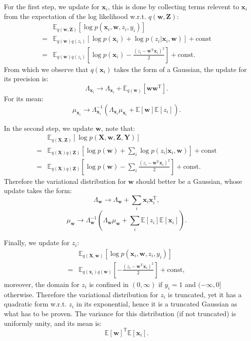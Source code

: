 \documentclass[UTF8]{ctexart}
\begin{document}
For the first step, we update for $\textbf{x}_{i}$, this is done by collecting terms relevent to $\textbf{x}_{i}$ from the expectation of the log likelihood w.r.t. $q(\textbf{w},\textbf{Z})$:
$$
\begin{aligned}
&\mathbb{E}_{q(\textbf{w},\textbf{Z})}\left[\log p(\textbf{x}_{i},\textbf{w},z_{i},y_{i}) \right]\\
=& \mathbb{E}_{q(\textbf{w})q(z_{i})}\left[ \log p(\textbf{x}_{i})+\log p(z_{i}|\textbf{x}_{i},\textbf{w})\right]+\text{const}\\
=&\mathbb{E}_{q(\textbf{w})q(z_{i})}\left[\log p(\textbf{x}_{i})-\frac{(z_{i}-\textbf{w}^{\text{T}}\textbf{x}_{i})^{2}}{2} \right]+\text{const}.
\end{aligned}
$$
From which we observe that $q(\textbf{x}_{i})$ takes the form of a Gaussian, the update for its precision is:
$$\Lambda_{\textbf{x}_{i}}\rightarrow \Lambda_{\textbf{x}_{i}}+\mathbb{E}_{q(\textbf{w})}\left[\textbf{w}\textbf{w}^{\text{T}}\right].$$
For its mean:
$$\mu_{\textbf{x}_{i}}\rightarrow \Lambda^{-1}_{\textbf{x}_{i}}\left(\Lambda_{\textbf{x}_{i}}\mu_{\textbf{x}_{i}}+\mathbb{E}[\textbf{w}]\mathbb{E}[z_{i}] \right).$$

In the second step, we update $\textbf{w}$, note that:
$$
\begin{aligned}
&\mathbb{E}_{q(\textbf{X},\textbf{Z})}[\log p(\textbf{X},\textbf{w},\textbf{Z},\textbf{Y})]\\
=&\mathbb{E}_{q(\textbf{X})q(\textbf{Z})}[\log p(\textbf{w})+\sum_{i}\log p(z_{i}|\textbf{x}_{i},\textbf{w})]+\text{const}\\
=&\mathbb{E}_{q(\textbf{X})q(\textbf{Z})}\left[\log p(\textbf{w})-\sum_{i}\frac{(z_{i}-\textbf{w}^{\text{T}}\textbf{x}_{i})^{2}}{2} \right]+\text{const}.
\end{aligned}
$$
Therefore the variational distribution for $\textbf{w}$ should better be a Gaussian, whose update takes the form:
$$\Lambda_{\textbf{w}}\rightarrow \Lambda_{\textbf{w}}+\sum_{i}\textbf{x}_{i}\textbf{x}_{i}^{\text{T}},$$
$$\mu_{\textbf{w}}\rightarrow \Lambda_{\textbf{w}}^{-1}(\Lambda_{\textbf{w}}\mu_{\textbf{w}}+\sum_{i}\mathbb{E}[z_{i}]\mathbb{E}[\textbf{x}_{i}]).$$

Finally, we update for $z_{i}$:
$$
\begin{aligned}
&\mathbb{E}_{q(\textbf{X},\textbf{w})}[\log p(\textbf{x}_{i},\textbf{w},z_{i},y_{i})]\\
=&\mathbb{E}_{q(\textbf{x}_{i})q(\textbf{w})}\left[-\frac{(z_{i}-\textbf{w}^{\text{T}}\textbf{x}_{i})^{2}}{2} \right]+\text{const},
\end{aligned}
$$
moreover, the domain for $z_{i}$ is confined in $(0,\infty)$ if $y_{i}=1$ and $(-\infty,0]$ otherwise. 
Therefore the variational distribution for $z_{i}$ is truncated, yet it has a quadratic form w.r.t. $z_{i}$ in its exponential, hence it is a truncated Gaussian as what has to be proven. 
The variance for this distribution (if not truncated) is uniformly unity, and its mean is:
$$\mathbb{E}[\textbf{w}]^{\text{T}}\mathbb{E}[\textbf{x}_{i}].$$
\end{document}
